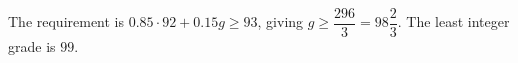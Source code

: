 The requirement is $0.85\cdot92+0.15g\ge93$, giving $g\ge\dfrac{296}{3}=98\dfrac{2}{3}$. The least integer grade is $\boxed{99}$.
